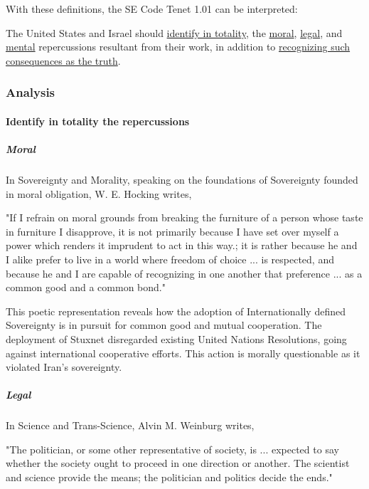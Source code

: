 \documentclass[12pt]{article}
\begin{document}
\begin{multicols}{2}
With these definitions, the SE Code Tenet 1.01 can be interpreted:
\begin{framed}
The United States and Israel should \ul{identify in totality}, the \ul{moral}, \ul{legal}, and \ul{mental} repercussions resultant from their work, in addition to \ul{recognizing such consequences as the truth}.
\end{framed}

\subsubsection{Analysis}

\paragraph{Identify in totality the repercussions}

\subparagraph{Moral}

In Sovereignty and Morality, speaking on the foundations of Sovereignty founded in moral obligation, W. E. Hocking writes,

\begin{displayquote}
"If I refrain on moral grounds from breaking the furniture of a person whose taste in furniture I disapprove, it is not primarily because I have set over myself a power which renders it imprudent to act in this way.; it is rather because he and I alike prefer to live in a world where freedom of choice ... is respected, and because he and I are capable of recognizing in one another that preference ... as a common good and a common bond."\cite{soverigntyAndMoralObligation}
\end{displayquote}

This poetic representation reveals how the adoption of Internationally defined Sovereignty is in pursuit for common good and mutual cooperation. The deployment of Stuxnet disregarded existing United Nations Resolutions, going against international cooperative efforts.\cite{resolution1747} This action is morally questionable as it violated Iran's sovereignty.

\subparagraph{Legal}

In Science and Trans-Science, Alvin M. Weinburg writes,

\begin{displayquote}
"The politician, or some other representative of society, is ... expected to say whether the society ought to proceed in one direction or another. The scientist and science provide the means; the politician and politics decide the ends."\cite{scienceAndTransScience}
\end{displayquote}


\end{multicols}
\end{document}
